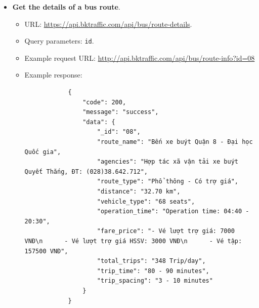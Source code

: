 \begin{itemize}
    \item \textbf{Get the details of a bus route}.
    \begin{itemize}
        \item URL: \url{https://api.bktraffic.com/api/bus/route-details}.
        \item Query parameters: \lstinline{id}.
        \item Example request URL: \url{http://api.bktraffic.com/api/bus/route-info?id=08}
        \item Example response:
        \begin{lstlisting}
            {
                "code": 200,
                "message": "success",
                "data": {
                    "_id": "08",
                    "route_name": "Bến xe buýt Quận 8 - Đại học Quốc gia",
                    "agencies": "Hợp tác xã vận tải xe buýt Quyết Thắng, ĐT: (028)38.642.712",
                    "route_type": "Phổ thông - Có trợ giá",
                    "distance": "32.70 km",
                    "vehicle_type": "68 seats",
                    "operation_time": "Operation time: 04:40 - 20:30",
                    "fare_price": "- Vé lượt trợ giá: 7000 VNĐ\n      - Vé lượt trợ giá HSSV: 3000 VNĐ\n      - Vé tập: 157500 VNĐ",
                    "total_trips": "348 Trip/day",
                    "trip_time": "80 - 90 minutes",
                    "trip_spacing": "3 - 10 minutes"
                }
            }
        \end{lstlisting}
    \end{itemize}


\end{itemize}
